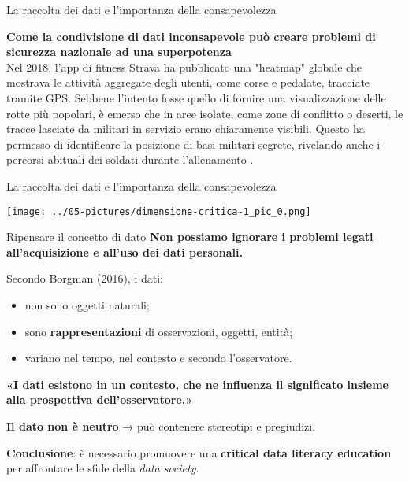 \documentclass{beamer}
\begin{document}
%
%
\begin{frame}{La raccolta dei dati e l'importanza della consapevolezza}

\textbf{Come la condivisione di dati inconsapevole può creare problemi di sicurezza nazionale ad una superpotenza}\\
\vspace{1cm}
Nel 2018, l'app di fitness Strava ha pubblicato una "heatmap" globale che mostrava le attività aggregate degli utenti, come corse e pedalate, tracciate tramite GPS. Sebbene l'intento fosse quello di fornire una visualizzazione delle rotte più popolari, è emerso che in aree isolate, come zone di conflitto o deserti, le tracce lasciate da militari in servizio erano chiaramente visibili. Questo ha permesso di identificare la posizione di basi militari segrete, rivelando anche i percorsi abituali dei soldati durante l'allenamento .
\end{frame}
%
%
\begin{frame}{La raccolta dei dati e l'importanza della consapevolezza}
\begin{center}
\texttt{[image: ../05-pictures/dimensione-critica-1\_pic\_0.png]} 
\end{center}
\end{frame}
%
%
\begin{frame}{Ripensare il concetto di dato}
\small
\textbf{Non possiamo ignorare i problemi legati all’acquisizione e all’uso dei dati personali.}

\vspace{0.3cm}
Secondo Borgman (2016), i dati:
\begin{itemize}
    \item non sono oggetti naturali;
    \item sono \textbf{rappresentazioni} di osservazioni, oggetti, entità;
    \item variano nel tempo, nel contesto e secondo l’osservatore.
\end{itemize}

\vspace{0.3cm}
\begin{block}{}
\textbf{«I dati esistono in un contesto, che ne influenza il significato insieme alla prospettiva dell’osservatore.»}
\end{block}

\vspace{0.3cm}
\textbf{Il dato non è neutro} → può contenere stereotipi e pregiudizi.

\vspace{0.3cm}
\textbf{Conclusione}: è necessario promuovere una \textbf{critical data literacy education} per affrontare le sfide della \textit{data society}.
\end{frame}
\end{document}
